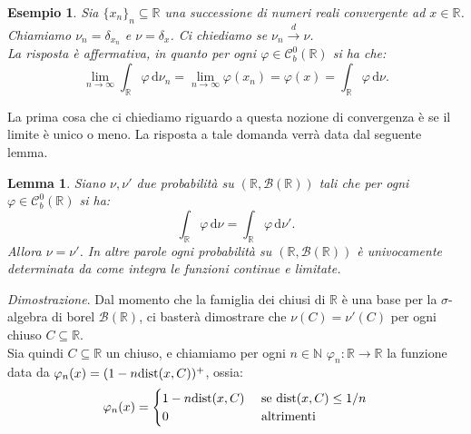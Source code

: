 \documentclass[11pt]{book}
\makeatletter
\theoremstyle{Definizione}
\theoremstyle{TeoremaProposizioneLemmaCorollario}
\newtheorem{mylem}[myteo]{Lemma}
\theoremstyle{OsservazioneNota}
\newtheorem{myes}{Esempio}[section]
\renewenvironment{proof}[1][\proofname]{\par
  \normalfont \topsep6\p@\@plus6\p@\relax
  \trivlist
  \item[\hskip\labelsep
        \itshape
    #1\@addpunct{.}]\ignorespaces
}{%
  \endtrivlist\@endpefalse
}
\newcommand{\R}{\mathbb{R}}
\newcommand{\N}{\mathbb{N}}
\renewcommand{\d}{\mathrm{d}}
\newcommand{\tod}{\overset{d}{\to}}
\renewenvironment{proof}{\textsl{Dimostrazione}.}{}
\makeatother
\begin{document}
\begin{myes}
Sia $\{x_n\}_n\subseteq \R$ una successione di numeri reali convergente ad $x\in \R$. Chiamiamo $\nu_n = \delta_{x_n}$ e $\nu = \delta_x$. Ci chiediamo se $\nu_n \tod \nu$.\\
La risposta è affermativa, in quanto per ogni $\varphi \in \mathcal{C}_b^0(\R)$ si ha che:
$$
\lim_{n \to \infty} \int_\R \varphi \,\d\nu_n = \lim_{n \to \infty} \varphi(x_n) = \varphi(x) = \int_\R \varphi \,\d\nu.
$$
\end{myes}
La prima cosa che ci chiediamo riguardo a questa nozione di convergenza è se il limite è unico o meno. La risposta a tale domanda verrà data dal seguente lemma.
\begin{boxoss}
\begin{mylem}
Siano $\nu,\nu'$ due probabilità su $(\R,\mathcal{B}(\R))$ tali che per ogni $\varphi\in \mathcal{C}_b^0(\R)$ si ha:
$$
\int_\R \varphi \,\d\nu = \int_\R \varphi \,\d\nu'.
$$
Allora $\nu = \nu'$. In altre parole ogni probabilità su $(\R,\mathcal{B}(\R))$ è univocamente determinata da come integra le funzioni continue e limitate.
\end{mylem}
\tcblower
\begin{proof}
Dal momento che la famiglia dei chiusi di $\R$ è una base per la $\sigma$-algebra di borel $\mathcal{B}(\R)$, ci basterà dimostrare che $\nu(C) = \nu'(C)$ per ogni chiuso $C\subseteq \R$.\\
Sia quindi $C\subseteq \R$ un chiuso, e chiamiamo per ogni $n\in \N$ $\varphi_n:\R \longrightarrow \R$ la funzione data da $\varphi_n(x) = (1-n \textup{dist}(x,C))^+$, ossia:
$$
\varphi_n(x) = \begin{cases}
1-n\textup{dist}(x,C) &\textup{ se }\textup{dist}(x,C)\leq 1/n\\
0 &\textup{ altrimenti}
\end{cases}
$$
\begin{center}
\end{center}
\end{proof}
\end{boxoss}
\end{document}

